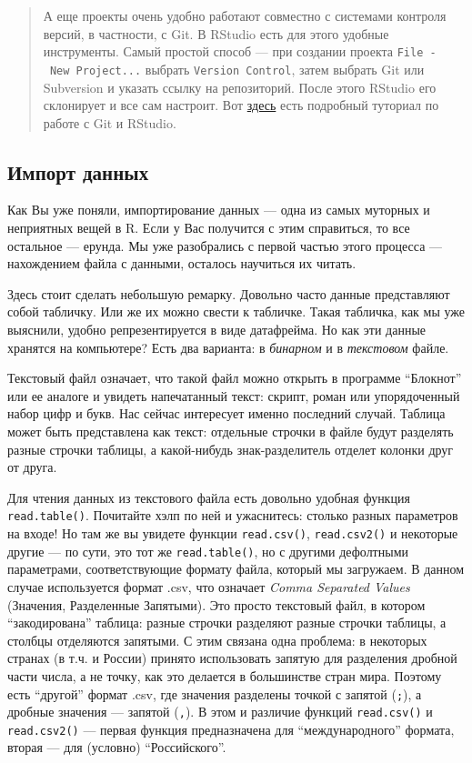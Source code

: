 \documentclass[]{book}
\begin{document}
\begin{quote}
А еще проекты очень удобно работают совместно с системами контроля
версий, в частности, с Git. В RStudio есть для этого удобные
инструменты. Самый простой способ --- при создании проекта
\texttt{File\ -\ New\ Project...} выбрать \texttt{Version\ Control},
затем выбрать Git или Subversion и указать ссылку на репозиторий. После
этого RStudio его склонирует и все сам настроит. Вот
\href{https://happygitwithr.com}{здесь} есть подробный туториал по
работе с Git и RStudio.
\end{quote}

\subsection{Импорт данных}\label{import}

Как Вы уже поняли, импортирование данных --- одна из самых муторных и
неприятных вещей в R. Если у Вас получится с этим справиться, то все
остальное --- ерунда. Мы уже разобрались с первой частью этого процесса
--- нахождением файла с данными, осталось научиться их читать.

Здесь стоит сделать небольшую ремарку. Довольно часто данные
представляют собой табличку. Или же их можно свести к табличке. Такая
табличка, как мы уже выяснили, удобно репрезентируется в виде
датафрейма. Но как эти данные хранятся на компьютере? Есть два варианта:
в \emph{бинарном} и в \emph{текстовом} файле.

Текстовый файл означает, что такой файл можно открыть в программе
``Блокнот'' или ее аналоге и увидеть напечатанный текст: скрипт, роман
или упорядоченный набор цифр и букв. Нас сейчас интересует именно
последний случай. Таблица может быть представлена как текст: отдельные
строчки в файле будут разделять разные строчки таблицы, а какой-нибудь
знак-разделитель отделет колонки друг от друга.

Для чтения данных из текстового файла есть довольно удобная функция
\texttt{read.table()}. Почитайте хэлп по ней и ужаснитесь: столько
разных параметров на входе! Но там же вы увидете функции
\texttt{read.csv()}, \texttt{read.csv2()} и некоторые другие --- по
сути, это тот же \texttt{read.table()}, но с другими дефолтными
параметрами, соответствующие формату файла, который мы загружаем. В
данном случае используется формат .csv, что означает \emph{Comma
Separated Values} (Значения, Разделенные Запятыми). Это просто текстовый
файл, в котором ``закодирована'' таблица: разные строчки разделяют
разные строчки таблицы, а столбцы отделяются запятыми. С этим связана
одна проблема: в некоторых странах (в т.ч. и России) принято
использовать запятую для разделения дробной части числа, а не точку, как
это делается в большинстве стран мира. Поэтому есть ``другой'' формат
.csv, где значения разделены точкой с запятой (\texttt{;}), а дробные
значения --- запятой (\texttt{,}). В этом и различие функций
\texttt{read.csv()} и \texttt{read.csv2()} --- первая функция
предназначена для ``международного'' формата, вторая --- для (условно)
``Российского''.
\end{document}
